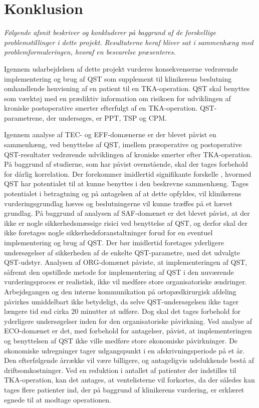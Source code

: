 \section{Konklusion}
\textit{Følgende afsnit beskriver og konkluderer på baggrund af de forskellige problemstillinger i dette projekt. Resultaterne heraf bliver sat i sammenhæng med problemformuleringen, hvoraf en besvarelse præsenteres.}

Igennem udarbejdelsen af dette projekt vurderes konsekvenserne vedrørende implementering og brug af QST som supplement til klinikerens beslutning omhandlende henvisning af en patient til en TKA-operation. QST skal benyttes som værktøj med en prædiktiv information om risikoen for udviklingen af kroniske postoperative smerter efterfulgt af en TKA-operation. QST-parametrene, der undersøges, er PPT, TSP og CPM.

Igennem analyse af TEC- og EFF-domænerne er der blevet påvist en sammenhæng, ved benyttelse af QST, imellem præoperative og postoperative QST-resultater vedrørende udviklingen af kroniske smerter efter TKA-operation. På baggrund af studierne, som har påvist ovenstående, skal der tages forbehold for dårlig korrelation. Der forekommer imidlertid signifikante forskelle , hvormed QST har potentialet til at kunne benyttes i den beskrevne sammenhæng. Tages potentialet i betragtning og på antagelsen af at dette opfyldes, vil klinikerens vurderingsgrundlag hæves og beslutningerne vil kunne træffes på et hævet grundlag. På baggrund af analysen af SAF-domænet er det blevet påvist, at der ikke er nogle sikkerhedsmæssige risici ved benyttelse af QST, og derfor skal der ikke foretages nogle sikkerhedsforanstaltninger forud for en eventuel implementering og brug af QST. Der bør imidlertid foretages yderligere undersøgelser af sikkerheden af de enkelte QST-parametre, med det udvalgte QST-udstyr.  Analysen af ORG-domænet påviste, at implementeringen af QST, såfremt den opstillede metode for implementering af QST i den nuværende vurderingsproces er realistisk, ikke vil medføre store organisatoriske ændringer. Arbejdsgangen og den interne kommunikation på ortopædkirurgisk afdeling påvirkes umiddelbart ikke betydeligt, da selve QST-undersøgelsen ikke tager længere tid end cirka 20 minutter at udføre. Dog skal det tages forbehold for yderligere undersøgelser inden for den organisatoriske påvirkning. Ved analyse af ECO-domænet er det, med forbehold for antagelser, påvist, at implementeringen og benyttelsen af QST ikke ville medføre store økonomiske påvirkninger. De økonomiske udregninger tager udgangspunkt i en afskrivningsperiode på et år. Den efterfølgende årrække vil være billigere, og antageligvis udelukkende bestå af driftsomkostninger. Ved en reduktion i antallet af patienter der indstilles til TKA-operation, kan det antages, at ventelisterne vil forkortes, da der således kan tages flere patienter ind, der på baggrund af klinikerens vurdering, er erklæret egnede til at modtage operationen.

